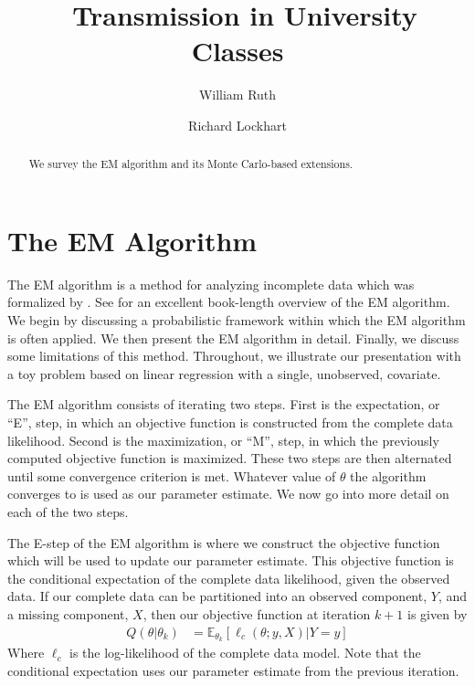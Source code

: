 \documentclass[11pt, oneside]{article}   	%
\title{\SARS\ Transmission in University Classes}
\author[1]{William Ruth}
\author[2]{Richard Lockhart}
\affil[1]{Corresponding Author - Department of Statistics and Actuarial Science \\ Simon Fraser University \\ Burnaby, BC  Canada \\ wruth@sfu.ca}
\affil[2]{Department of Statistics and Actuarial Science \\ Simon Fraser University \\ Burnaby, BC  Canada}
\date{}
\newcommand{\bE}{\mathbb{E}}
\begin{document}


\begin{abstract}
    We survey the EM algorithm and its Monte Carlo-based extensions.
\end{abstract}

\section{The EM Algorithm}


The EM algorithm is a method for analyzing incomplete data which was formalized by \citet{Dem77}. See \citet{McL08} for an excellent book-length overview of the EM algorithm. We begin by discussing a probabilistic framework within which the EM algorithm is often applied. We then present the EM algorithm in detail. Finally, we discuss some limitations of this method. Throughout, we illustrate our presentation with a toy problem based on linear regression with a single, unobserved, covariate.

The EM algorithm consists of iterating two steps. First is the expectation, or ``E'', step, in which an objective function is constructed from the complete data likelihood. Second is the maximization, or ``M'', step, in which the previously computed objective function is maximized. These two steps are then alternated until some convergence criterion is met. Whatever value of $\theta$ the algorithm converges to is used as our parameter estimate. We now go into more detail on each of the two steps.

The E-step of the EM algorithm is where we construct the objective function which will be used to update our parameter estimate. This objective function is the conditional expectation of the complete data likelihood, given the observed data. If our complete data can be partitioned into an observed component, $Y$, and a missing component, $X$, then our objective function at iteration $k+1$ is given by
%
\begin{align}
    Q(\theta|\theta_k) & = \bE_{\theta_k}[\ell_c(\theta; y, X) | Y=y]
\end{align}
%
Where $\ell_c$ is the log-likelihood of the complete data model. Note that the conditional expectation uses our parameter estimate from the previous iteration.
\end{document}
